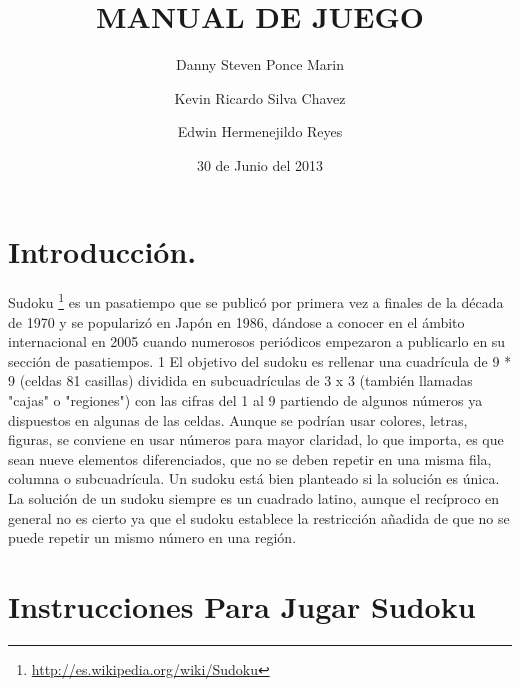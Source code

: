 \documentclass[12pt,oneside]{book}
\title{\Huge MANUAL DE JUEGO}
\author {Danny Steven Ponce Marin \and Kevin Ricardo Silva Chavez \and Edwin Hermenejildo Reyes}
\date{30 de Junio del 2013}
\begin{document}
	
	\maketitle
	\tableofcontents
	
	\chapter{ Introducción.} Sudoku \footnote{\url{http://es.wikipedia.org/wiki/Sudoku}} es un pasatiempo que se publicó por primera vez a finales de la década de 1970 y se popularizó en Japón en 1986, dándose a conocer en el ámbito internacional en 2005 cuando numerosos periódicos empezaron a publicarlo en su sección de pasatiempos. 1 El objetivo del sudoku es rellenar una cuadrícula de 9 *  9 (celdas 81 casillas) dividida en subcuadrículas de 3 x 3 (también llamadas "cajas" o "regiones") con las cifras del 1 al 9 partiendo de algunos números ya dispuestos en algunas de las celdas. Aunque se podrían usar colores, letras, figuras, se conviene en usar números para mayor claridad, lo que importa, es que sean nueve elementos diferenciados, que no se deben repetir en una misma fila, columna o subcuadrícula. Un sudoku está bien planteado si la solución es única. La solución de un sudoku siempre es un cuadrado latino, aunque el recíproco en general no es cierto ya que el sudoku establece la restricción añadida de que no se puede repetir un mismo número en una región.

	\chapter{Instrucciones Para Jugar Sudoku}

	\newpage
\end{document}
